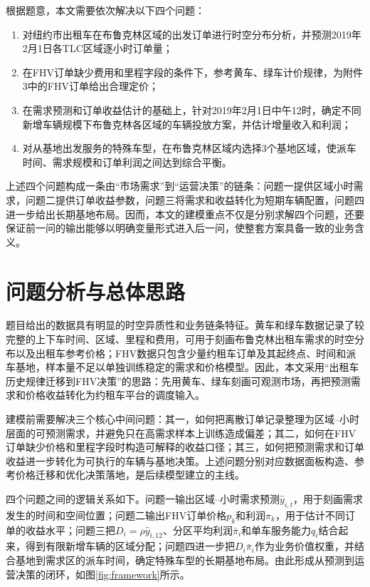 \documentclass[UTF8,a4paper,12pt]{ctexart}
\begin{document}
根据题意，本文需要依次解决以下四个问题：
\begin{enumerate}
    \item 对纽约市出租车在布鲁克林区域的出发订单进行时空分布分析，并预测2019年2月1日各TLC区域逐小时订单量；
    \item 在FHV订单缺少费用和里程字段的条件下，参考黄车、绿车计价规律，为附件3中的FHV订单给出合理定价；
    \item 在需求预测和订单收益估计的基础上，针对2019年2月1日中午12时，确定不同新增车辆规模下布鲁克林各区域的车辆投放方案，并估计增量收入和利润；
    \item 对从基地出发服务的特殊车型，在布鲁克林区域内选择3个基地区域，使派车时间、需求规模和订单利润之间达到综合平衡。
\end{enumerate}

上述四个问题构成一条由“市场需求”到“运营决策”的链条：问题一提供区域小时需求，问题二提供订单收益参数，问题三将需求和收益转化为短期车辆配置，问题四进一步给出长期基地布局。因而，本文的建模重点不仅是分别求解四个问题，还要保证前一问的输出能够以明确变量形式进入后一问，使整套方案具备一致的业务含义。

\clearpage
\section{问题分析与总体思路}
题目给出的数据具有明显的时空异质性和业务链条特征。黄车和绿车数据记录了较完整的上下车时间、区域、里程和费用，可用于刻画布鲁克林出租车需求的时空分布以及出租车参考价格；FHV数据只包含少量约租车订单及其起终点、时间和派车基地，样本量不足以单独训练稳定的需求和价格模型。因此，本文采用“出租车历史规律迁移到FHV决策”的思路：先用黄车、绿车刻画可观测市场，再把预测需求和价格收益转化为约租车平台的调度输入。

建模前需要解决三个核心中间问题：其一，如何把离散订单记录整理为区域--小时层面的可预测需求，并避免只在高需求样本上训练造成偏差；其二，如何在FHV订单缺少价格和里程字段时构造可解释的收益口径；其三，如何把预测需求和订单收益进一步转化为可执行的车辆与基地决策。上述问题分别对应数据面板构造、参考价格迁移和优化决策落地，是后续模型建立的主线。

四个问题之间的逻辑关系如下。问题一输出区域--小时需求预测$\hat{y}_{i,t}$，用于刻画需求发生的时间和空间位置；问题二输出FHV订单价格$p_k$和利润$\pi_k$，用于估计不同订单的收益水平；问题三把$D_i=\rho\hat{y}_{i,12}$、分区平均利润$\bar{\pi}_i$和单车服务能力$q_i$结合起来，得到有限新增车辆的区域分配；问题四进一步把$D_i\bar{\pi}_i$作为业务价值权重，并结合基地到需求区的派车时间，确定特殊车型的长期基地布局。由此形成从预测到运营决策的闭环，如图\ref{fig:framework}所示。
\end{document}
